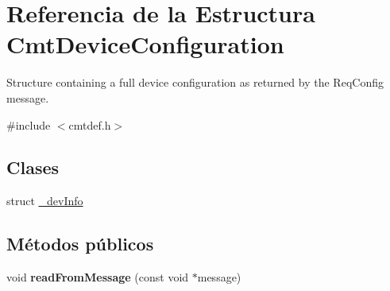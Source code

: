 \hypertarget{structCmtDeviceConfiguration}{\section{\-Referencia de la \-Estructura \-Cmt\-Device\-Configuration}
\label{structCmtDeviceConfiguration}
}


\-Structure containing a full device configuration as returned by the \-Req\-Config message.  




{\ttfamily \#include $<$cmtdef.\-h$>$}

\subsection*{\-Clases}
\begin{DoxyCompactItemize}
\item 
struct \hyperlink{structCmtDeviceConfiguration_1_1__devInfo}{\-\_\-dev\-Info}
\end{DoxyCompactItemize}
\subsection*{\-Métodos públicos}
\begin{DoxyCompactItemize}
\item 
\hypertarget{structCmtDeviceConfiguration_a963782509f593cc0e073b0426b4cccf5}{void {\bfseries read\-From\-Message} (const void $\ast$message)}\label{structCmtDeviceConfiguration_a963782509f593cc0e073b0426b4cccf5}

\end{DoxyCompactItemize}
